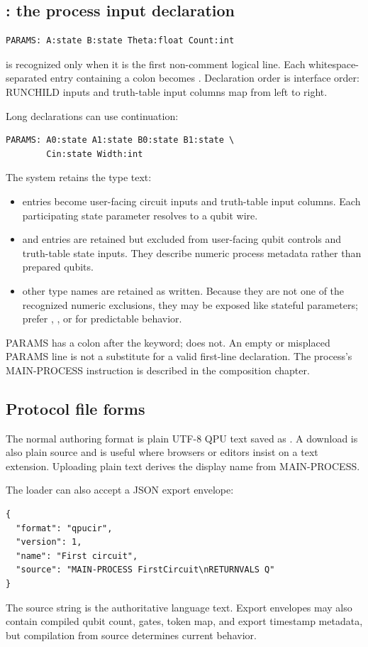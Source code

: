 \subsection{: the process input declaration}

\begin{lstlisting}
PARAMS: A:state B:state Theta:float Count:int
\end{lstlisting}

 is recognized only when it is the first non-comment logical
line. Each whitespace-separated entry containing a colon becomes
. Declaration order is interface order: RUNCHILD inputs and
truth-table input columns map from left to right.

Long declarations can use continuation:
\begin{lstlisting}
PARAMS: A0:state A1:state B0:state B1:state \
        Cin:state Width:int
\end{lstlisting}

The system retains the type text:
\begin{itemize}
  \item {} entries become user-facing circuit inputs and truth-table
  input columns. Each participating state parameter resolves to a qubit wire.
  \item \code{int} and \code{float} entries are retained but excluded from
  user-facing qubit controls and truth-table state inputs. They describe
  numeric process metadata rather than prepared qubits.
  \item other type names are retained as written. Because they are not one of
  the recognized numeric exclusions, they may be exposed like stateful
  parameters; prefer \code{state}, \code{int}, or \code{float} for predictable
  behavior.
\end{itemize}

PARAMS has a colon after the keyword;  does not. An empty or
misplaced PARAMS line is not a substitute for a valid first-line declaration.
The process's MAIN-PROCESS instruction is described in the composition chapter.

\subsection{Protocol file forms}

The normal authoring format is plain UTF-8 QPU text saved as
. A  download is also plain source
and is useful where browsers or editors insist on a text extension. Uploading
plain text derives the display name from MAIN-PROCESS.

The loader can also accept a JSON export envelope:
\begin{lstlisting}[language={}]
{
  "format": "qpucir",
  "version": 1,
  "name": "First circuit",
  "source": "MAIN-PROCESS FirstCircuit\nRETURNVALS Q"
}
\end{lstlisting}
The source string is the authoritative language text. Export envelopes may
also contain compiled qubit count, gates, token map, and export timestamp
metadata, but compilation from source determines current behavior.

